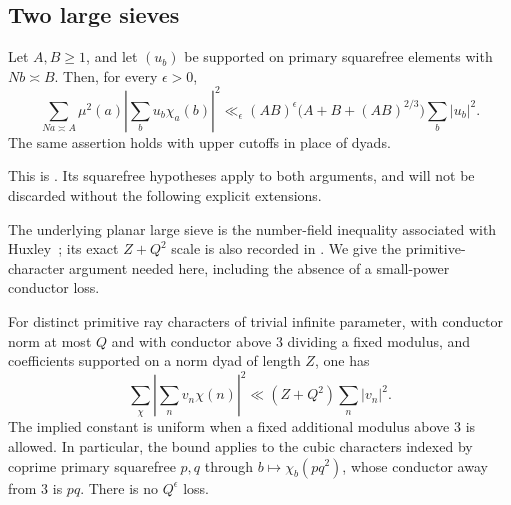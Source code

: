 \subsection{Two large sieves}

\begin{theorem}
\label{thm:cls}
Let $A,B\ge1$, and let $(u_b)$ be supported on primary squarefree
elements with $Nb\asymp B$. Then, for every $\epsilon>0$,
\[
 \sum_{Na\asymp A}\mu^2(a)
 \left|\sum_b u_b\chi_a(b)\right|^2
 \ll_\epsilon (AB)^\epsilon
 \bigl(A+B+(AB)^{2/3}\bigr)\sum_b|u_b|^2.
\]
The same assertion holds with upper cutoffs in place of dyads.
\end{theorem}

This is \cite[Theorem 2]{HB2000}. Its squarefree hypotheses apply to
both arguments, and will not be discarded without the following
explicit extensions.

The underlying planar large sieve is the number-field inequality
associated with Huxley~\cite{Huxley1968}; its exact $Z+Q^2$ scale
is also recorded in \cite[Equation (1.2)]{GaoZhao2022}. We give the
primitive-character argument needed here, including the absence of a
small-power conductor loss.

\begin{lemma}
\label{lem:ordinary-sieve}
For distinct primitive ray characters of trivial infinite parameter,
with conductor norm at most $Q$ and with conductor above $3$ dividing
a fixed modulus, and coefficients supported on a norm dyad of length
$Z$, one has
\[
 \sum_\chi\left|\sum_n v_n\chi(n)\right|^2
 \ll (Z+Q^2)\sum_n|v_n|^2.
\]
The implied constant is uniform when a fixed additional modulus above
$3$ is allowed. In particular, the bound applies to the cubic characters
indexed by coprime primary squarefree $p,q$ through
$b\mapsto\chi_b(pq^2)$, whose conductor away from $3$ is $pq$.
There is no $Q^\epsilon$ loss.
\end{lemma}

